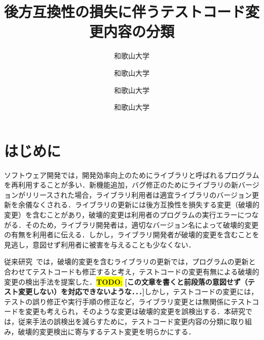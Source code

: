 \documentclass[uplatex,dvipdfmx,a4paper,twocolumn,base=11pt,jbase=11pt,ja=standard]{bxjsarticle}  %
\title{後方互換性の損失に伴うテストコード変更内容の分類}{A classification of test code changes accompanied by a lack of backward compatibility}
\author{和歌山大学}{前川　大樹}{Daiki Maekawa, Wakayama University}
\author{和歌山大学}{伊原　彰紀}{Akinori Ihara, Wakayama University}
\author{和歌山大学}{大森　楓己}{Fuki Omori, Wakayama University}
\author{和歌山大学}{才木　一也}{Kazuya Saiki, Wakayama University}
\newcommand{\todo}[1]{\colorbox{yellow}{{\bf TODO}:}{\color{red} {\textbf{[#1]}}}}
\begin{document}
\maketitle

\section{はじめに}

ソフトウェア開発では，開発効率向上のためにライブラリと呼ばれるプログラムを再利用することが多い．新機能追加，バグ修正のためにライブラリの新バージョンがリリースされた場合，ライブラリ利用者は適宜ライブラリのバージョン更新を余儀なくされる．ライブラリの更新には後方互換性を損失する変更（破壊的変更）を含むことがあり，破壊的変更は利用者のプログラムの実行エラーにつながる．そのため，ライブラリ開発者は，適切なバージョン名によって破壊的変更の有無を利用者に伝える．しかし，ライブラリ開発者が破壊的変更を含むことを見逃し，意図せず利用者に被害を与えることも少なくない．


従来研究~\cite{FOSE2021_Matsuda}では，破壊的変更を含むライブラリの更新では，プログラムの更新と合わせてテストコードも修正すると考え，テストコードの変更有無による破壊的変更の検出手法を提案した．\todo{この文章を書くと前段落の意図せず（テスト変更しない）を対応できないような．．．}しかし，テストコードの変更には，テストの誤り修正や実行手順の修正など，ライブラリ変更とは無関係にテストコードを変更も考えられ，そのような変更は破壊的変更を誤検出する．本研究では，従来手法の誤検出を減らすために，テストコード変更内容の分類に取り組み，破壊的変更検出に寄与するテスト変更を明らかにする．
\end{document}

